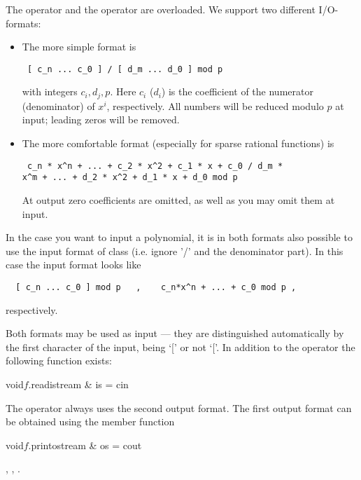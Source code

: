 The  operator \code{>>} and the  operator \code{<<} are overloaded.
We support two different I/O-formats:
\begin{itemize}
\item
  The more simple format is
\begin{verbatim} [ c_n ... c_0 ] / [ d_m ... d_0 ] mod p \end{verbatim}
with integers $c_i, d_j, p$.  Here $c_i$ ($d_i$) is the coefficient of the numerator
(denominator) of $x^i$, respectively.  All numbers will be reduced modulo $p$ at input; leading
zeros will be removed.

\item
  The more comfortable format (especially for sparse rational functions) is
\begin{verbatim} c_n * x^n + ... + c_2 * x^2 + c_1 * x + c_0 / d_m *
x^m + ... + d_2 * x^2 + d_1 * x + d_0 mod p
\end{verbatim}
  At output zero coefficients are omitted, as well as you may omit them
  at input.
\end{itemize}

In the case you want to input a polynomial, it is in both formats also possible to use the input
format of class  (i.e. ignore '/' and the denominator part).  In this case
the input format looks like
\begin{verbatim}
  [ c_n ... c_0 ] mod p   ,    c_n*x^n + ... + c_0 mod p ,
\end{verbatim}
respectively.

Both formats may be used as input --- they are distinguished automatically by the first
character of the input, being `[' or not `['.  In addition to the  operator
\code{>>} the following function exists:

\begin{fcode}{void}{$f$.read}{istream & is = cin}
\end{fcode}

The  operator \code{<<} always uses the second output format.  The first output
format can be obtained using the member function

\begin{cfcode}{void}{$f$.print}{ostream & os = cout}
\end{cfcode}



\SEEALSO

, , .


